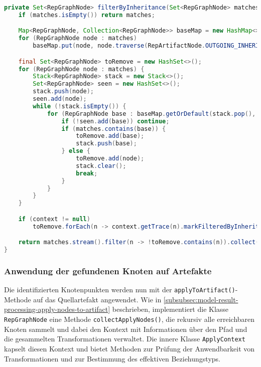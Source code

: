 \begin{lstlisting}[language=Java,caption={Methode \texttt{filterByInheritance}},label=lst:impl-filterByInheritance,basicstyle=\ttfamily\scriptsize]
private Set<RepGraphNode> filterByInheritance(Set<RepGraphNode> matches, RepMatchingContext context) {
    if (matches.isEmpty()) return matches;

    Map<RepGraphNode, Collection<RepGraphNode>> baseMap = new HashMap<>();
    for (RepGraphNode node : matches)
        baseMap.put(node, node.traverse(RepArtifactNode.OUTGOING_INHERITANCE_ARTIFACT_NODE_QUERY).values());

    final Set<RepGraphNode> toRemove = new HashSet<>();
    for (RepGraphNode node : matches) {
        Stack<RepGraphNode> stack = new Stack<>();
        Set<RepGraphNode> seen = new HashSet<>();
        stack.push(node);
        seen.add(node);
        while (!stack.isEmpty()) {
            for (RepGraphNode base : baseMap.getOrDefault(stack.pop(), Collections.emptyList())) {
                if (!seen.add(base)) continue;
                if (matches.contains(base)) {
                    toRemove.add(base);
                    stack.push(base);
                } else {
                    toRemove.add(node);
                    stack.clear();
                    break;
                }
            }
        }
    }

    if (context != null)
        toRemove.forEach(n -> context.getTrace(n).markFilteredByInheritance());

    return matches.stream().filter(n -> !toRemove.contains(n)).collect(Collectors.toSet());
}
\end{lstlisting}

\subsubsection{Anwendung der gefundenen Knoten auf Artefakte}

Die identifizierten Knotenpunkten werden nun mit der \texttt{applyToArtifact()}-Methode auf das Quellartefakt angewendet.
Wie in \autoref{subsubsec:model-result-processing-apply-nodes-to-artifact} beschrieben, implementiert die Klasse \texttt{RepGraphNode} eine Methode \texttt{collectApplyNodes()}, die rekursiv alle erreichbaren Knoten sammelt und dabei den Kontext mit Informationen über den Pfad und die gesammelten Transformationen verwaltet.
Die innere Klasse \texttt{ApplyContext} kapselt diesen Kontext und bietet Methoden zur Prüfung der Anwendbarkeit von Transformationen und zur Bestimmung des effektiven Beziehungstyps.

